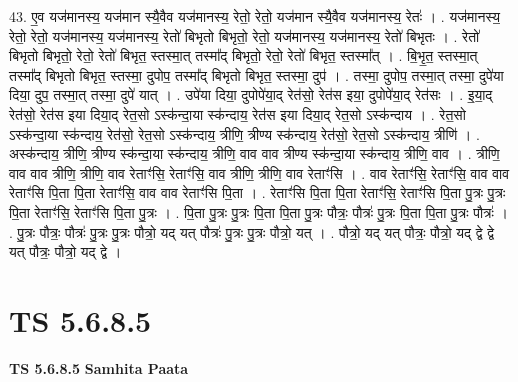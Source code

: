 \documentclass[17pt]{extarticle}
\begin{document}
43. ए॒व यज॑मानस्य॒ यज॑मान स्यै॒वैव यज॑मानस्य॒ रेतो॒ रेतो॒ यज॑मान स्यै॒वैव यज॑मानस्य॒ रेतः॑ । . यज॑मानस्य॒ रेतो॒ रेतो॒ यज॑मानस्य॒ यज॑मानस्य॒ रेतो॑ बिभृतो बिभृतो॒ रेतो॒ यज॑मानस्य॒ यज॑मानस्य॒ रेतो॑ बिभृतः । . रेतो॑ बिभृतो बिभृतो॒ रेतो॒ रेतो॑ बिभृत॒ स्तस्मा॒त् तस्मा᳚द् बिभृतो॒ रेतो॒ रेतो॑ बिभृत॒ स्तस्मा᳚त् । . बि॒भृ॒त॒ स्तस्मा॒त् तस्मा᳚द् बिभृतो बिभृत॒ स्तस्मा॒ दुपोप॒ तस्मा᳚द् बिभृतो बिभृत॒ स्तस्मा॒ दुप॑ । . तस्मा॒ दुपोप॒ तस्मा॒त् तस्मा॒ दुपे॑या दिया॒ दुप॒ तस्मा॒त् तस्मा॒ दुपे॑ यात् । . उपे॑या दिया॒ दुपोपे॑या॒द् रेत॑सो॒ रेत॑स इया॒ दुपोपे॑या॒द् रेत॑सः । . इ॒या॒द् रेत॑सो॒ रेत॑स इया दिया॒द् रेत॒सो ऽस्क॑न्दा॒या स्क॑न्दाय॒ रेत॑स इया दिया॒द् रेत॒सो ऽस्क॑न्दाय । . रेत॒सो ऽस्क॑न्दा॒या स्क॑न्दाय॒ रेत॑सो॒ रेत॒सो ऽस्क॑न्दाय॒ त्रीणि॒ त्रीण्य स्क॑न्दाय॒ रेत॑सो॒ रेत॒सो ऽस्क॑न्दाय॒ त्रीणि॑ । . अस्क॑न्दाय॒ त्रीणि॒ त्रीण्य स्क॑न्दा॒या स्क॑न्दाय॒ त्रीणि॒ वाव वाव त्रीण्य स्क॑न्दा॒या स्क॑न्दाय॒ त्रीणि॒ वाव । . त्रीणि॒ वाव वाव त्रीणि॒ त्रीणि॒ वाव रेताꣳ॑सि॒ रेताꣳ॑सि॒ वाव त्रीणि॒ त्रीणि॒ वाव रेताꣳ॑सि । . वाव रेताꣳ॑सि॒ रेताꣳ॑सि॒ वाव वाव रेताꣳ॑सि पि॒ता पि॒ता रेताꣳ॑सि॒ वाव वाव रेताꣳ॑सि पि॒ता । . रेताꣳ॑सि पि॒ता पि॒ता रेताꣳ॑सि॒ रेताꣳ॑सि पि॒ता पु॒त्रः पु॒त्रः पि॒ता रेताꣳ॑सि॒ रेताꣳ॑सि पि॒ता पु॒त्रः । . पि॒ता पु॒त्रः पु॒त्रः पि॒ता पि॒ता पु॒त्रः पौत्रः॒ पौत्रः॑ पु॒त्रः पि॒ता पि॒ता पु॒त्रः पौत्रः॑ । . पु॒त्रः पौत्रः॒ पौत्रः॑ पु॒त्रः पु॒त्रः पौत्रो॒ यद् यत् पौत्रः॑ पु॒त्रः पु॒त्रः पौत्रो॒ यत् । . पौत्रो॒ यद् यत् पौत्रः॒ पौत्रो॒ यद् द्वे द्वे यत् पौत्रः॒ पौत्रो॒ यद् द्वे । \newline
\pagebreak
{}

\section{ TS 5.6.8.5 }

\textbf{TS 5.6.8.5 } \newline
\textbf{Samhita Paata} \newline
\end{document}
